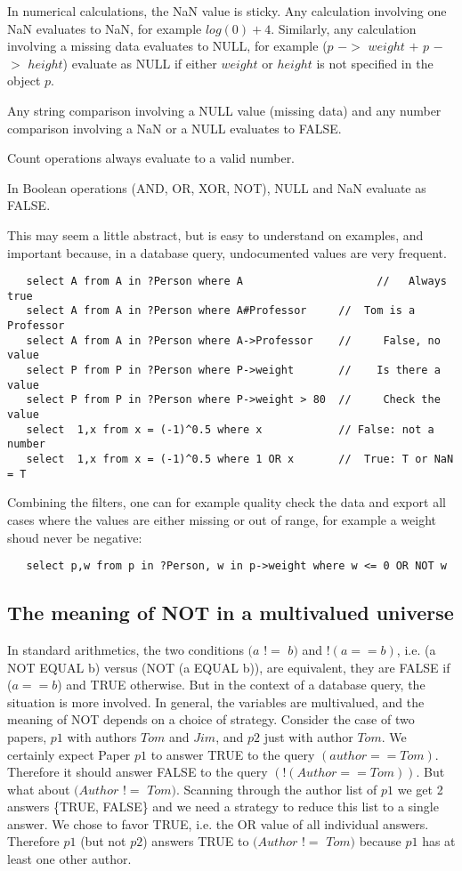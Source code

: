 \documentclass[11pt]{article}
\newcommand{\BL}{\begin{lstlisting}}
\begin{document}
In numerical calculations, the NaN value is sticky. Any calculation involving one NaN
evaluates to NaN, for example $log(0) + 4$. Similarly, any calculation
involving a missing data evaluates to NULL, for example ($p$ $-$$>$ $weight$ $+$ $p$ $-$$>$ $height$)
evaluate as NULL
if either $weight$ or $height$ is not specified in the object $p$.

Any string comparison involving a NULL value (missing data) and any number comparison
involving a NaN or a NULL evaluates to FALSE.

Count operations always evaluate to a valid number.

In Boolean operations (AND, OR, XOR, NOT), NULL and NaN evaluate as FALSE.

This may seem a little abstract, but is easy to understand on examples, and important
because, in a database query, undocumented values are very frequent.

\BL
   select A from A in ?Person where A                     //   Always true
   select A from A in ?Person where A#Professor     //  Tom is a Professor
   select A from A in ?Person where A->Professor    //     False, no value
   select P from P in ?Person where P->weight       //    Is there a value
   select P from P in ?Person where P->weight > 80  //     Check the value
   select  1,x from x = (-1)^0.5 where x            // False: not a number
   select  1,x from x = (-1)^0.5 where 1 OR x       //  True: T or NaN = T
\end{lstlisting}

Combining the filters, one can for example quality check the data and export all cases
where the values are either missing or out of range, for example a weight shoud never
be negative:
\BL
   select p,w from p in ?Person, w in p->weight where w <= 0 OR NOT w 
\end{lstlisting}

\subsection{The meaning of NOT in a multivalued universe}

In standard arithmetics, the two conditions $(a$ $!$$=$ $b)$ and $! (a == b)$, 
i.e. (a NOT EQUAL b) versus (NOT (a EQUAL b)),
are equivalent, they are FALSE if ($a == b$) and TRUE otherwise. But in
the context of a database query, the situation is more involved.
In general, the variables are multivalued, and the meaning of NOT depends
on a choice of strategy. Consider the case of two
papers, $p1$ with authors $Tom$ and $Jim$, and $p2$ just with author $Tom$.
We certainly expect Paper $p1$ to answer TRUE to the query $(author == Tom)$.
Therefore it should answer FALSE to the query $(! (Author == Tom))$.
But what about $(Author$ $!$$=$ $Tom)$. Scanning through the author list of $p1$
we get 2 answers \{TRUE, FALSE\} and we need a strategy to reduce this list 
to a single answer. We chose to favor TRUE, i.e. the OR value of
all individual answers. Therefore $p1$ (but not $p2$) answers TRUE to 
$(Author$ $!$$=$ $Tom)$
because $p1$ has at least one other author.
\end{document}
